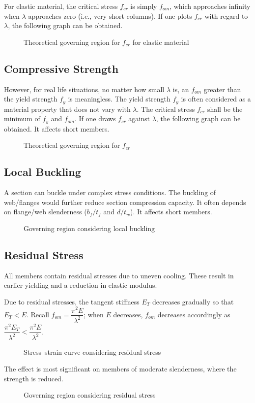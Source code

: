 For elastic material, the critical stress $f_{cr}$ is simply $f_{om}$, which approaches infinity when $\lambda$ approaches zero (i.e., very short columns).
If one plots $f_{cr}$ with regard to $\lambda$, the following graph can be obtained.
\begin{figure}[H]
\centering
\caption{Theoretical governing region for $f_{cr}$ for elastic material}
\end{figure}
\subsection{Compressive Strength}
However, for real life situations, no matter how small $\lambda$ is, an $f_{om}$ greater than the yield strength $f_y$ is meaningless.
The yield strength $f_y$ is often considered as a material property that does not vary with $\lambda$.
The critical stress $f_{cr}$ shall be the minimum of $f_y$ and $f_{om}$.
If one draws $f_{cr}$ against $\lambda$, the following graph can be obtained.
It affects short members.
\begin{figure}[H]
\centering
\caption{Theoretical governing region for $f_{cr}$}
\end{figure}
\subsection{Local Buckling}
A section can buckle under complex stress conditions.
The buckling of web/flanges would further reduce section compression capacity.
It often depends on flange/web slenderness ($b_f/t_f$ and $d/t_w$).
It affects short members.
\begin{figure}[H]
\centering
\caption{Governing region considering local buckling}
\end{figure}
\subsection{Residual Stress}
All members contain residual stresses due to uneven cooling.
These result in earlier yielding and a reduction in elastic modulus.

Due to residual stresses, the tangent stiffness $E_T$ decreases gradually so that $E_T<E$.
Recall $f_{om}=\dfrac{\pi^2E}{\lambda^2}$; when $E$ decreases, $f_{om}$ decreases accordingly as $\dfrac{\pi^2E_T}{\lambda^2}<\dfrac{\pi^2E}{\lambda^2}$.
\begin{figure}[H]
\centering
\caption{Stress--strain curve considering residual stress}
\end{figure}
The effect is most significant on members of moderate slenderness, where the strength is reduced.
\begin{figure}[H]
\centering
\caption{Governing region considering residual stress}
\end{figure}
